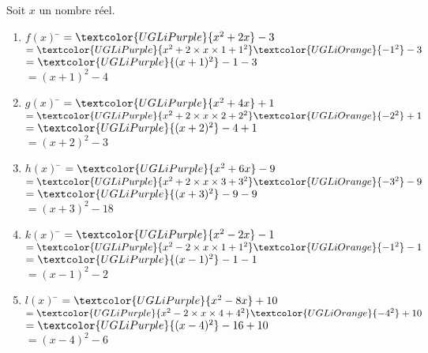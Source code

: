 \documentclass[a4paper,11pt,exos]{nsi} %
\begin{document}
Soit $x$ un nombre réel.
\begin{multicols}{2}
    \begin{enumerate}[label=\textbullet]
        \item \begin{tabbing}
            $f(x)$  \=  $=\textcolor{UGLiPurple}{x^2+2x}-3$\\
            \>  $=\textcolor{UGLiPurple}{x^2+2\times x\times 1 +1^2} \textcolor{UGLiOrange}{-1^2}-3$\\
            \>  $=\textcolor{UGLiPurple}{(x+1)^2}-1-3$\\
            \>  $=(x+1)^2-4$
        \end{tabbing}
    
        \item \begin{tabbing}
            $g(x)$  \=  $=\textcolor{UGLiPurple}{x^2+4x}+1$\\
            \>  $=\textcolor{UGLiPurple}{x^2+2\times x\times 2+2^2}\textcolor{UGLiOrange}{-2^2}+1$\\
            \>  $=\textcolor{UGLiPurple}{(x+2)^2}-4+1$\\
            \>  $=(x+2)^2-3$
        \end{tabbing}
    
        \item \begin{tabbing}
            $h(x)$  \=  $=\textcolor{UGLiPurple}{x^2+6x}-9$\\
            \>  $=\textcolor{UGLiPurple}{x^2+2\times x\times 3+3^2}\textcolor{UGLiOrange}{-3^2}-9$\\
            \>  $=\textcolor{UGLiPurple}{(x+3)^2}-9-9$\\
            \>  $=(x+3)^2-18$
        \end{tabbing}
    \columnbreak
        \item \begin{tabbing}
            $k(x)$  \=  $=\textcolor{UGLiPurple}{x^2-2x}-1$\\
            \>$=\textcolor{UGLiPurple}{x^2-2\times x\times 1+1^2}\textcolor{UGLiOrange}{-1^2}-1$\\
            \>  $=\textcolor{UGLiPurple}{(x-1)^2}-1-1$\\
            \>  $=(x-1)^2-2$
        \end{tabbing}
    
        \item \begin{tabbing}
            $l(x)$  \=  $=\textcolor{UGLiPurple}{x^2-8x}+10$\\
            \>  $=\textcolor{UGLiPurple}{x^2-2\times x\times 4+4^2}\textcolor{UGLiOrange}{-4^2}+10$\\
            \>  $=\textcolor{UGLiPurple}{(x-4)^2}-16+10$\\
            \>  $=(x-4)^2-6$
        \end{tabbing}
    

\end{enumerate}
\end{multicols}
\end{document}
